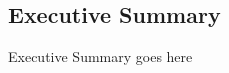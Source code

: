 \begin{center}
\section*{\textbf{Executive Summary}}
\end{center}

Executive Summary goes here

\newpage

